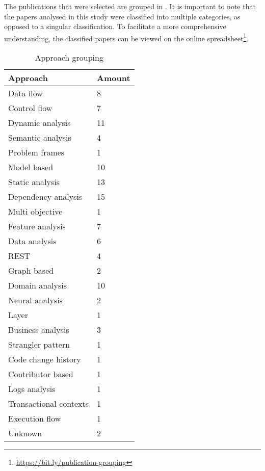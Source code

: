 The publications that were selected are grouped in
. It is
important to note that the papers analysed in this study were classified into
multiple categories, as opposed to a singular classification. To facilitate a
more comprehensive understanding, the classified papers can be viewed on the
online spreadsheet\footnote{\url{https://bit.ly/publication-grouping}}.

\begin{table}[!htb] \caption{Approach grouping} \label{tab:approach-grouping}
  \begin{center}
    \begin{tabular}[c]{p{12em}|p{4em}}
      \textbf{Approach} &
      \textbf{Amount} \\
      \hline Data flow & {8} \\
      \hline Control flow & {7} \\
      \hline Dynamic analysis & {11} \\
      \hline Semantic analysis & {4} \\
      \hline Problem frames & {1} \\
      \hline Model based & {10} \\
      \hline Static analysis & {13} \\
      \hline Dependency analysis & {15} \\
      \hline Multi objective & {1} \\
      \hline Feature analysis & {7} \\
      \hline Data analysis & {6} \\
      \hline REST & {4} \\
      \hline Graph based & {2} \\
      \hline Domain analysis & {10} \\
      \hline Neural analysis & {2} \\
      \hline Layer & {1} \\
      \hline Business analysis & {3} \\
      \hline Strangler pattern & {1} \\
      \hline Code change history & {1} \\
      \hline Contributor based & {1} \\
      \hline Logs analysis & {1} \\
      \hline Transactional contexts & {1} \\
      \hline Execution flow & {1} \\
      \hline Unknown & {2} \\
    \end{tabular}
  \end{center}
\end{table}

